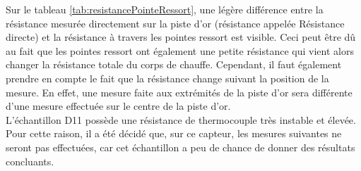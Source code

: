 Sur le tableau \ref{tab:resistancePointeRessort}, une légère différence entre la résistance mesurée directement sur la piste d'or (résistance 
appelée Résistance directe) et la résistance à travers les pointes ressort est visible. Ceci peut être dû au fait que les pointes ressort ont 
également une petite résistance qui vient alors changer la résistance totale du corps de chauffe. Cependant, il faut également prendre en 
compte le fait que la résistance change suivant la position de la mesure. En effet, une mesure faite aux extrémités de la piste d'or sera différente 
d'une mesure effectuée sur le centre de la piste d'or. \\

L'échantillon D11 possède une résistance de thermocouple très instable et élevée. Pour cette raison, il a été décidé que, sur ce capteur, les 
mesures suivantes ne seront pas effectuées, car cet échantillon a peu de chance de donner des résultats concluants. 

